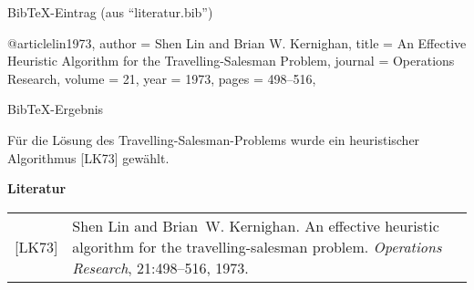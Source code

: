 \documentclass{beamer}
\begin{document}

		\begin{frame}[containsverbatim]{Bib\TeX-Eintrag}
			 (aus ``literatur.bib'')
			\begin{latexcode}
@article{lin1973,
	author  = {Shen Lin and Brian W. Kernighan},
	title   = {An Effective Heuristic Algorithm for the
	           Travelling-Salesman Problem},
	journal = {Operations Research},
	volume  = {21},
	year    = {1973},
	pages   = {498--516},
}
			\end{latexcode}
		\end{frame}


		\begin{frame}{Bib\TeX{}-Ergebnis}

			\vspace{0.2cm}
			Für die Lösung des Travelling-Salesman-Problems
			wurde ein heuristischer Algorithmus [LK73]
			gewählt.

			\vspace{0.5cm}
			{\Large \textbf{Literatur}}\\

			\vspace{0.3cm}
			\begin{tabular}{lp{9cm}}
				[LK73] & Shen Lin and Brian~W. Kernighan. An effective heuristic algorithm for
				         the travelling-salesman problem.
				         {\em Operations Research}, 21:498--516, 1973.
			\end{tabular}
		\end{frame}

\end{document}
